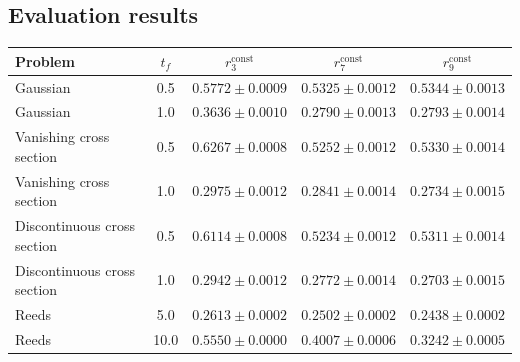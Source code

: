 \documentclass[10pt]{article}
\newcommand{\rconst}[1]{r_{#1}^{\mathrm{const}}}
\begin{document}
\subsection*{Evaluation results}
\begin{center}
{\scriptsize
\begin{tabular}{l c c c c}
\toprule
Problem & \(t_f\) & \(\rconst{3}\) & \(\rconst{7}\) & \(\rconst{9}\) \\
\midrule
Gaussian & 0.5 & \(0.5772 \pm 0.0009\) & \(0.5325 \pm 0.0012\) & \(0.5344 \pm 0.0013\) \\
Gaussian & 1.0 & \(0.3636 \pm 0.0010\) & \(0.2790 \pm 0.0013\) & \(0.2793 \pm 0.0014\) \\
Vanishing cross section & 0.5 & \(0.6267 \pm 0.0008\) & \(0.5252 \pm 0.0012\) & \(0.5330 \pm 0.0014\) \\
Vanishing cross section & 1.0 & \(0.2975 \pm 0.0012\) & \(0.2841 \pm 0.0014\) & \(0.2734 \pm 0.0015\) \\
Discontinuous cross section & 0.5 & \(0.6114 \pm 0.0008\) & \(0.5234 \pm 0.0012\) & \(0.5311 \pm 0.0014\) \\
Discontinuous cross section & 1.0 & \(0.2942 \pm 0.0012\) & \(0.2772 \pm 0.0014\) & \(0.2703 \pm 0.0015\) \\
Reeds & 5.0 & \(0.2613 \pm 0.0002\) & \(0.2502 \pm 0.0002\) & \(0.2438 \pm 0.0002\) \\
Reeds & 10.0 & \(0.5550 \pm 0.0000\) & \(0.4007 \pm 0.0006\) & \(0.3242 \pm 0.0005\) \\
\bottomrule
\end{tabular}
}
\end{center}
\end{document}

